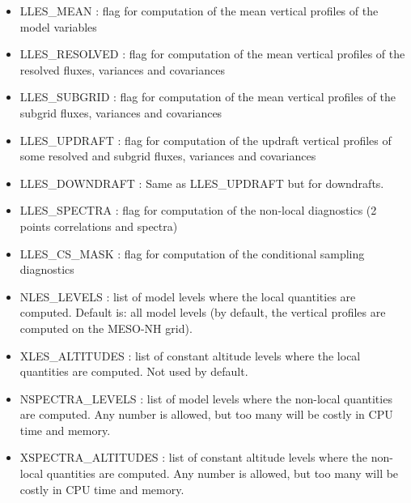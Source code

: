 \begin{itemize}
\item
LLES\_MEAN  : flag for computation of the
mean vertical profiles of the model variables

\item
LLES\_RESOLVED : flag for computation of the
mean vertical profiles of the resolved fluxes, variances and covariances

\item
LLES\_SUBGRID : flag for computation of the
mean vertical profiles of the subgrid fluxes, variances and covariances

\item
LLES\_UPDRAFT : flag for computation of the
updraft vertical profiles of some resolved and subgrid fluxes,
variances and covariances

\item
LLES\_DOWNDRAFT  : Same as LLES\_UPDRAFT but for downdrafts.
\item
LLES\_SPECTRA  : flag for computation of the
non-local diagnostics (2 points correlations and spectra)

\item
LLES\_CS\_MASK  : flag for computation of the
conditional sampling diagnostics                           
\item
NLES\_LEVELS : list of model levels where the local quantities
are computed. Default is: all model levels (by default, the vertical profiles
are computed on the MESO-NH grid).

\item
XLES\_ALTITUDES : list of constant altitude levels where
the local quantities are computed. Not used by default.

\item
NSPECTRA\_LEVELS  : list of model levels where the non-local quantities
are computed. Any number is allowed, but too many will be costly
in CPU time and memory.

\item
XSPECTRA\_ALTITUDES  : list of constant altitude levels where
the non-local quantities are computed. Any number is allowed,
but too many will be costly in CPU time and memory.


\end{itemize}
